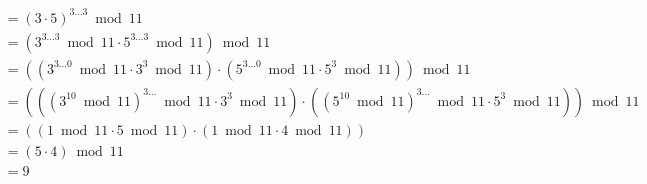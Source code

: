 \documentclass[12pt,letterpaper]{cos340hw}
\begin{document}
\begin{align}
	&= (3 \cdot 5)^{3 \dots 3} \bmod{11}\\
	&= (3^{3 \dots 3} \bmod{11} \cdot 5^{3 \dots 3} \bmod{11}) \bmod{11}\\
	&= ((3^{3 \dots 0} \bmod{11} \cdot 3^3 \bmod{11}) \cdot (5^{3 \dots 0} \bmod{11} \cdot 5^3 \bmod{11})) \bmod{11}\\
	&= (((3^{10} \bmod{11})^{3 \dots} \bmod{11} \cdot 3^3 \bmod{11}) \cdot ((5^{10} \bmod{11})^{3 \dots} \bmod{11} \cdot 5^3 \bmod{11})) \bmod{11}\\
	&= ((1 \bmod{11} \cdot 5 \bmod{11}) \cdot (1 \bmod{11} \cdot 4 \bmod{11}))\\
	&= (5 \cdot 4) \bmod{11}\\
	&= 9\\
\end{align}


\end{document}
